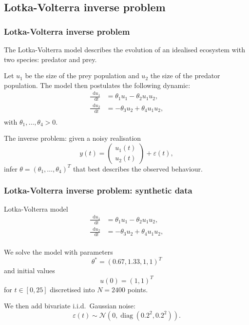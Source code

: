 \documentclass{beamer}
\newcommand*\diff{\mathop{}\!\mathrm{d}}
\DeclareMathOperator{\diag}{diag}
\begin{document}
\subsection{Lotka-Volterra inverse problem}

\begin{frame}
\frametitle{Lotka-Volterra inverse problem}

The Lotka-Volterra model describes the evolution of an idealised ecosystem with two species: predator and prey.

Let $u_1$ be the size of the prey population and $u_2$ the size of the predator population. The model then postulates the following dynamic:
\begin{equation*}
\begin{aligned}
\frac{\diff u_1}{\diff t} & = \theta_1 u_1 - \theta_2 u_1 u_2, \\
\frac{\diff u_2}{\diff t} & = -\theta_3 u_2 + \theta_4 u_1 u_2, \\
\end{aligned}
\end{equation*}
with $\theta_1, \dots, \theta_4 > 0$.

The inverse problem: given a noisy realisation
\begin{equation*}
y(t) = \begin{pmatrix}
u_1(t) \\ u_2(t)
\end{pmatrix}
+ \varepsilon(t),
\end{equation*}
infer $\theta = (\theta_1, \dots, \theta_4)^T$ that best describes the observed behaviour.

\end{frame}

\begin{frame}
\frametitle{Lotka-Volterra inverse problem: synthetic data}

\begin{block}{Lotka-Volterra model}
\begin{equation*}
\begin{aligned}
\frac{\diff u_1}{\diff t} & = \theta_1 u_1 - \theta_2 u_1 u_2, \\
\frac{\diff u_2}{\diff t} & = -\theta_3 u_2 + \theta_4 u_1 u_2, \\
\end{aligned}
\end{equation*}
\end{block}

We solve the model with parameters
\begin{equation*}
\theta^* = (0.67, 1.33, 1, 1)^T
\end{equation*}
and initial values
\begin{equation*}
u(0) = (1, 1)^T
\end{equation*}
for $t \in [0, 25]$ discretised into $N = 2400$ points.

We then add bivariate i.i.d.\ Gaussian noise:
\begin{equation*}
\varepsilon(t) \sim \mathcal{N}(0, \diag(0.2^2, 0.2^2)).
\end{equation*}

\end{frame}
\end{document}
